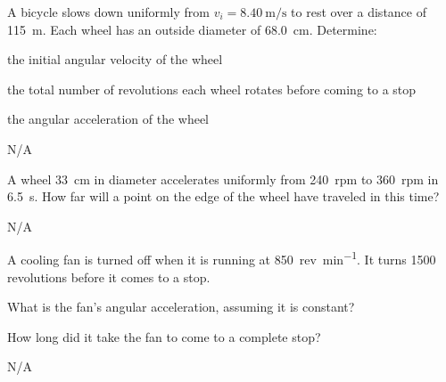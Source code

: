 \begin{question}[ID=rotational-B-Q02,topic=rotational-motion,difficulty=B]
    A bicycle slows down uniformly from $v_i = \SI{8.40}{\meter\per\second}$
        to rest over a distance of \SI{115}{\meter}.
    Each wheel has an outside diameter of \SI{68.0}{\centi\meter}.
    Determine:
    \begin{enumerate*}[label=\arabic*)]
        \item the initial angular velocity of the wheel
        \item the total number of revolutions each wheel rotates before coming to a stop
        \item the angular acceleration of the wheel
    \end{enumerate*}
\end{question}
\begin{solution}
    N/A
\end{solution}


\begin{question}[ID=rotational-B-Q03,topic=rotational-motion,difficulty=B]
    A wheel \SI{33}{\centi\meter} in diameter accelerates uniformly from
        \SI{240}{rpm} to \SI{360}{rpm} in \SI{6.5}{\second}.
    How far will a point on the edge of the wheel have traveled in this time?
\end{question}
\begin{solution}
    N/A
\end{solution}


\begin{question}[ID=rotational-B-Q04,topic=rotational-motion,difficulty=B]
    A cooling fan is turned off when it is running at
        \SI{850}{rev\per\minute}.
    It turns \num{1500} revolutions before it comes to a stop.  
    \begin{enumerate*}[label=\arabic*)]
        \item What is the fan's angular acceleration, assuming it is constant?
        \item How long did it take the fan to come to a complete stop?
    \end{enumerate*}
\end{question}
\begin{solution}
    N/A
\end{solution}


